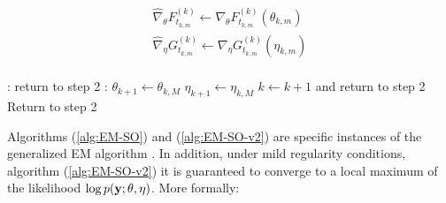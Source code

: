 \begin{algorithm}
\begin{algorithmic}[1]
\begin{gather}
            \widehat \nabla_\theta F_{t_{k,m}}^{(k)} \gets \nabla_\theta F_{t_{k,m}}^{(k)}(\theta_{k,m}) \\
            \widehat \nabla_\eta G_{t_{k,m}}^{(k)} \gets \nabla_\eta G_{t_{k,m}}^{(k)}(\eta_{k,m})
        \end{gather}
    \EndIf
\EndFor
%
\\
%
:
    \State return to step 2 
\Else:
    \State $\theta_{k+1} \gets \theta_{k,M}$
    \State $\eta_{k+1} \gets \eta_{k,M}$
    \State $k \gets k+1$ and return to step 2
\EndIf
%
\State Return to step 2
\end{algorithmic}
\end{algorithm}


Algorithms (\ref{alg:EM-SO}) and (\ref{alg:EM-SO-v2}) are specific instances of the generalized EM algorithm \citep{Dempster:1977}. In addition, under mild regularity conditions, algorithm (\ref{alg:EM-SO-v2}) it is guaranteed to converge to a local maximum of the likelihood $\log p(\mathbf{y};\theta,\eta)$. More formally:
    
